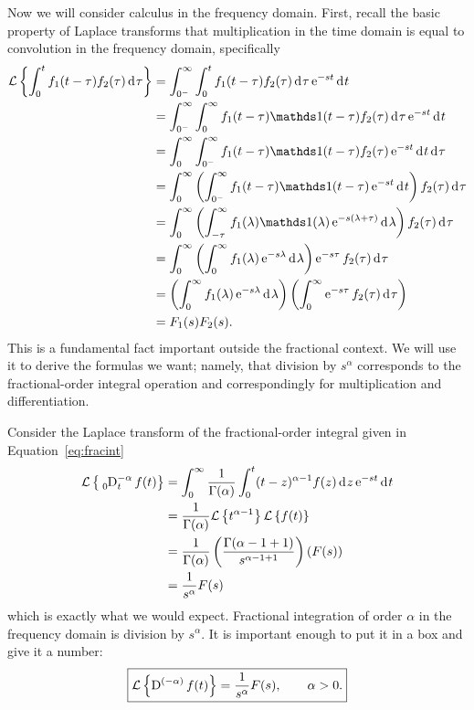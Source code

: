     Now we will consider calculus in the frequency domain. First, recall the basic property of Laplace transforms that multiplication in the time domain is equal to convolution in the frequency domain, specifically
    \begin{align*}
      \mathcal L \left\{ \int_0^t f_1(t - \tau) f_2(\tau) \d \tau \right\} &= \int_{0^-}^\infty   \int_0^t f_1(t - \tau) f_2(\tau) \d \tau \e^{-s t} \d t \\
      &= \int_{0^-}^\infty \int_0^\infty f_1(t - \tau) \mathds 1 (t - \tau) f_2(\tau) \d \tau \e^{-st} \d t \\
      &= \int_0^\infty \int_{0^-}^\infty f_1(t - \tau) \mathds 1 (t - \tau) f_2(\tau) \e^{-st} \d t \d \tau \\
      &= \int_0^\infty \left(   \int_{0^-}^\infty f_1(t - \tau) \mathds 1 (t - \tau) \e^{-st} \d t \right) f_2(\tau)  \d \tau \\
      &= \int_0^\infty \left( \int_{-\tau}^\infty f_1(\lambda) \mathds 1 (\lambda) \e^{-s (\lambda + \tau)} \d \lambda \right) f_2(\tau) \d \tau \\
      &= \int_0^\infty \left( \int_{0}^\infty f_1(\lambda)  \e^{-s \lambda } \d \lambda \right) \e^{-s \tau} f_2(\tau) \d \tau \\
      &=  \left( \int_{0}^\infty f_1(\lambda)  \e^{-s \lambda } \d \lambda \right) \left( \int_0^\infty \e^{-s \tau} f_2(\tau) \d \tau \right) \\
      &= F_1(s) F_2(s).
    \end{align*}
    This is a fundamental fact important outside the fractional context. We will use it to derive the formulas we want; namely, that division by $s^\alpha$ corresponds to the fractional-order integral operation and correspondingly for multiplication and differentiation.

    Consider the Laplace transform of the fractional-order integral given in Equation~\ref{eq:fracint}
    \begin{align*}
      \mathcal L \left\{ \tensor*[_0]{\D}{^{-\alpha}_t} f(t) \right\} &= \int_0^\infty \frac{1}{\Gamma(\alpha)} \int_0^t (t-z)^{\alpha - 1} f(z) \d z \e^{-st} \d t\\
      &= \frac{1}{\Gamma(\alpha)} \mathcal L \left\{ t^{\alpha - 1} \right\} \mathcal L \left\{ f(t) \right\} \\
      &= \frac{1}{\Gamma(\alpha)} \left( \frac{\Gamma(\alpha - 1 + 1)}{s^{\alpha-1+1}} \right) \left( F(s) \right) \\
      &= \frac{1}{s^\alpha} F(s)
    \end{align*}
    which is exactly what we would expect. Fractional integration of order $\alpha$ in the frequency domain is division by $s^\alpha$. 
    It is important enough to  put it in a box and give it a number:
    \begin{equation}
      \boxed{ \mathcal L \left\{ \tensor*[]{\D}{^{(-\alpha)}}f(t) \right\} = \frac{1}{s^\alpha} F(s), \qquad \alpha>0. }
      \label{eq:fracintfreq}
    \end{equation}
   
